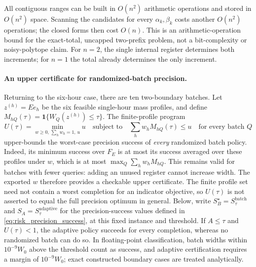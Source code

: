 All contiguous ranges can be built in $O(n^2)$ arithmetic operations
and stored in $O(n^2)$ space. Scanning the candidates for every
$\alpha_k,\beta_k$ costs another $O(n^2)$ operations; the closed forms
then cost $O(n)$. This is an arithmetic-operation bound for the exact-total,
uncapped two-prefix problem, not a bit-complexity or noisy-polytope claim.
For $n=2$, the single internal register determines both increments;
for $n=1$ the total already determines the only increment.


\paragraph{An upper certificate for randomized-batch precision.}
Returning to the six-hour case, there are ten two-boundary batches.
Let $z^{(h)}=Ee_h$ be the six feasible
single-hour mass profiles, and define
$M_{hQ}(\tau)=\mathbf1\{W_Q(z^{(h)})\leq\tau\}$.
The finite-profile program
\begin{equation}
 U(\tau)=\min_{w\geq0,\,\sum_hw_h=1,\,u}u
 \quad\text{subject to}\quad
 \sum_hw_hM_{hQ}(\tau)\leq u\quad\text{for every batch }Q
 \label{eq:counter-precision-upper}
\end{equation}
upper-bounds the worst-case precision success of \emph{every} randomized
batch policy. Indeed, its minimum success over $F_E$ is at most its success
averaged over these profiles under $w$, which is at most
$\max_Q\sum_hw_hM_{hQ}$. This remains valid for batches with fewer queries:
adding an unused register cannot increase width. The exported $w$ therefore
provides a checkable upper certificate. The finite profile set need not
contain a worst completion for an indicator objective, so $U(\tau)$ is not
asserted to equal the full precision optimum in general. Below, write
$S_B^\star=S_\tau^{\mathrm{batch}}$ and
$S_A=S_\tau^{\mathrm{adaptive}}$ for the precision-success values defined
in \eqref{eq:risk_precision_success}, at this fixed instance and threshold.
If $A\leq\tau$ and $U(\tau)<1$, the adaptive policy succeeds for every
completion, whereas no randomized batch can do so. In floating-point
classification, batch widths within $10^{-9}W_0$ above the threshold count
as success, and adaptive certification requires a margin of
$10^{-9}W_0$; exact constructed boundary cases are treated analytically.

